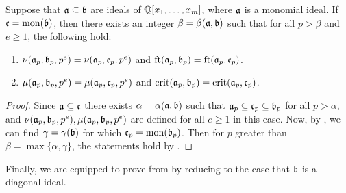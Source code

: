 \documentclass[11pt]{amsart}
\begin{document}
 
\begin{corollary} \label{nu-mu-reduce-monomial: C}
Suppose that $\mathfrak{a} \subseteq \mathfrak{b}$ are ideals of $\mathbb{Q}[x_1, \ldots, x_m]$, where $\mathfrak{a}$ is a monomial ideal. If $\mathfrak{c} = \operatorname{mon}(\mathfrak{b})$, then there exists an integer $\beta = \beta(\mathfrak{a}, \mathfrak{b})$ such that for all $p > \beta$ and $e \geq 1$, the following hold:
\begin{enumerate}
\item $\nu(\mathfrak{a}_p, \mathfrak{b}_p, p^e) = \nu(\mathfrak{a}_p, \mathfrak{c}_p, p^e)$ and $\operatorname{ft}(\mathfrak{a}_p, \mathfrak{b}_p) = \operatorname{ft}(\mathfrak{a}_p, \mathfrak{c}_p)$.
\item $\mu(\mathfrak{a}_p, \mathfrak{b}_p, p^e) = \mu(\mathfrak{a}_p, \mathfrak{c}_p, p^e)$ and $\operatorname{crit}(\mathfrak{a}_p,\mathfrak{b}_p) = \operatorname{crit}(\mathfrak{a}_p,\mathfrak{c}_p)$. 
\end{enumerate}
\end{corollary}


\begin{proof}
Since $\mathfrak{a} \subseteq \mathfrak{c}$ there exists $\alpha = \alpha(\mathfrak{a}, \mathfrak{b})$ such that $\mathfrak{a}_p \subseteq \mathfrak{c}_p \subseteq 
\mathfrak{b}_p$ for all $p > \alpha$, and 
$\nu(\mathfrak{a}_p, \mathfrak{b}_p, p^e), \mu(\mathfrak{a}_p, \mathfrak{b}_p, p^e)$ are defined for all $e \geq 1$ in this case. 
Now, by , we can find $\gamma = \gamma(\mathfrak{b})$ for which $\mathfrak{c}_p = \operatorname{mon}(\mathfrak{b}_p)$.  Then for $p$ greater than $\beta = \max\{ \alpha, \gamma \}$, the statements hold by .
\end{proof}




Finally, we are equipped to prove  from  by reducing to the case that $\mathfrak{b}$ is a diagonal ideal. 
\end{document}
